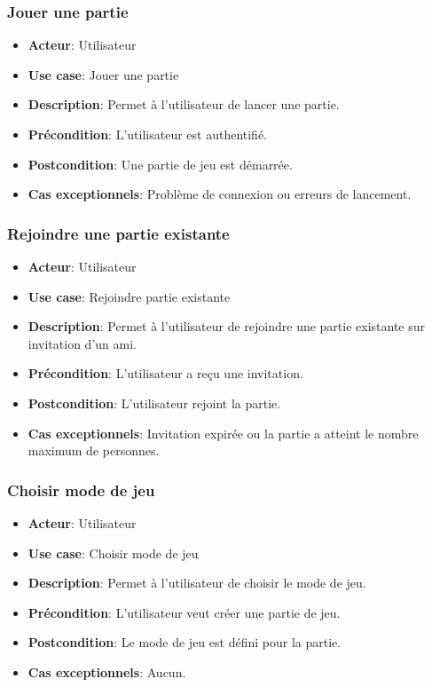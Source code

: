 \documentclass{article}
\begin{document}
\subsubsection*{Jouer une partie}
\begin{itemize}
    \item \textbf{Acteur}: Utilisateur
    \item \textbf{Use case}: Jouer une partie
    \item \textbf{Description}: Permet à l'utilisateur de lancer une partie.
    \item \textbf{Précondition}: L'utilisateur est authentifié.
    \item \textbf{Postcondition}: Une partie de jeu est démarrée.
    \item \textbf{Cas exceptionnels}: Problème de connexion ou erreurs de lancement.
\end{itemize}

\subsubsection*{Rejoindre une partie existante}
\begin{itemize}
    \item \textbf{Acteur}: Utilisateur
    \item \textbf{Use case}: Rejoindre partie existante
    \item \textbf{Description}: Permet à l'utilisateur de rejoindre une partie existante sur invitation d'un ami.
    \item \textbf{Précondition}: L'utilisateur a reçu une invitation.
    \item \textbf{Postcondition}: L'utilisateur rejoint la partie.
    \item \textbf{Cas exceptionnels}: Invitation expirée ou la partie a atteint le nombre maximum de personnes.
\end{itemize}

\subsubsection*{Choisir mode de jeu}
\begin{itemize}
    \item \textbf{Acteur}: Utilisateur
    \item \textbf{Use case}: Choisir mode de jeu
    \item \textbf{Description}: Permet à l'utilisateur de choisir le mode de jeu.
    \item \textbf{Précondition}: L'utilisateur veut créer une partie de jeu.
    \item \textbf{Postcondition}: Le mode de jeu est défini pour la partie.
    \item \textbf{Cas exceptionnels}: Aucun.
\end{itemize}
\end{document}
